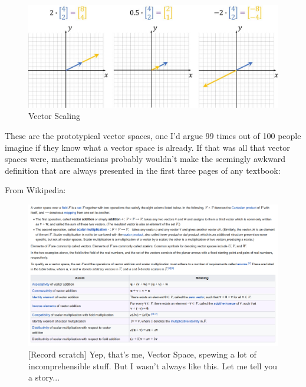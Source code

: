 \documentclass[
]{book}
\begin{document}
\begin{figure}

{\centering \includegraphics[width=1\linewidth,height=1\textheight]{images/Vector-scaling} 

}

\caption{Vector Scaling}\label{fig:unnamed-chunk-2}
\end{figure}

These are the prototypical vector spaces, one I'd argue 99 times out of 100 people imagine if they know what a vector space is already. If that was all that vector spaces were, mathematicians probably wouldn't make the seemingly awkward definition that are always presented in the first three pages of any textbook:

From Wikipedia:

\begin{figure}

{\centering \includegraphics[width=1\linewidth,height=1\textheight]{images/vector-space-axioms-wikipedia_2} 

}

\caption{[Record scratch]  Yep, that's me, Vector Space, spewing a lot of incomprehensible stuff.  But I wasn't always like this.  Let me tell you a story...}\label{fig:unnamed-chunk-3}
\end{figure}
\end{document}
